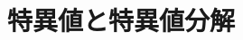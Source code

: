 \documentclass[../../topic_linear-algebra]{subfiles}
\begin{document}
\chapter{特異値と特異値分解}



\end{document}
